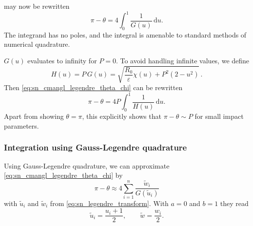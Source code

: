  may now be rewritten
%
\begin{equation}
    \label{eq:sn_cmangl_legendre_theta_chi}
    \pi - \theta = 4 \int_0^1  \frac{ 1 }{ G(u) } \, \mathrm{d}u .
\end{equation}
%
The integrand has no poles, and the integral is amenable to standard methods of numerical quadrature.

$G(u)$ evaluates to infinity for $P = 0$. To avoid handling infinite values, we define
%
\begin{equation}
    \label{eq:sn_H_def}
    H(u) = P \, G(u) = \sqrt{\frac{R_0}{\varepsilon} \chi(u) + P^2 (2-u^2)} \, .
\end{equation}
%
Then \cref{eq:sn_cmangl_legendre_theta_chi} can be rewritten
%
\begin{equation}
    \label{eq:sn_cmangl_legendre_theta_H}
    \pi - \theta = 4 P \int_0^1  \frac{ 1 }{ H(u) } \, \mathrm{d}u .
\end{equation}
%
Apart from showing $\theta = \pi$, this explicitly shows that $\pi - \theta \sim P$ for small impact parameters.

\subsubsection{Integration using Gauss-Legendre quadrature}
%
Using Gauss-Legendre quadrature, we can approximate \cref{eq:sn_cmangl_legendre_theta_chi} by
%
\begin{equation}
    \label{eq:sn_cmangl_legendre_theta_chi_approx_plain}
    \pi - \theta \approx
        4 \sum_{i=1}^n \frac{ \tilde{w}_i }{ G(\tilde{u}_i) }
\end{equation}
%
with \(\tilde{u}_i\) and \(\tilde{w}_i\) from \cref{eq:sn_legendre_transform}. With $a=0$ and $b=1$ they read
%
\begin{equation}
    \label{eq:sn_gauss_legendre_transform_infinite}
    \tilde{u}_i = \frac{ u_i + 1 }{ 2 }, \qquad
    \tilde{w} = \frac{ w_i }{ 2 }.
\end{equation}

